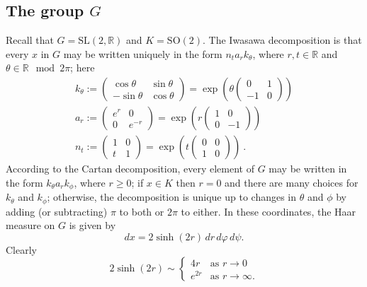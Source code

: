 \documentclass[12pt,a4paper]{amsart}
\theoremstyle{definition}
\theoremstyle{remark}
\numberwithin{equation}{section}
\newcommand{\lpar}{\left(}
\newcommand{\rpar}{\right)}
\newcommand{\R}{\mathbb{R}}
\begin{document}
\subsection*{The group $G$}
Recall that $G = \mathrm{SL}(2,\mathbb{R})$ and $K = \mathrm{SO}(2)$.
The Iwasawa decomposition is that every $x$ in $G$ may be written uniquely in the form $n_t a_r k_\theta$, where $r, t\in \R$ and $\theta \in \R \mod 2\pi$; here
\[
\begin{gathered}
k_\theta := \begin{pmatrix} \cos\theta & \sin\theta \\ -\sin\theta & \cos\theta \end{pmatrix} = \exp\lpar \theta \begin{pmatrix} 0 & 1 \\ -1 & 0 \end{pmatrix} \rpar
\\
a_r := \begin{pmatrix} e^r &0 \\ 0  & e^{-r} \end{pmatrix} 
= \exp\lpar r \begin{pmatrix} 1 & 0 \\ 0 & -1\end{pmatrix} \rpar
\\
n_t := \begin{pmatrix} 1 & 0 \\ t & 1 \end{pmatrix} = \exp\lpar t \begin{pmatrix} 0 & 0\\ 1 & 0 \end{pmatrix} \rpar \ .
\end{gathered}
\]
According to the Cartan decomposition, every element of $G$ may be written in the form $k_\theta a_r k_\phi$, where $r \geq 0$; if $x \in K$ then $r = 0$ and there are many choices for $k_\theta$ and $k_\phi$; otherwise, the decomposition is unique up to changes in $\theta$ and $\phi$ by adding (or subtracting) $\pi$ to both or $2\pi$ to either.
In these coordinates, the Haar measure on $G$ is given by
\begin{equation*}%
dx=2 \sinh(2r) \,dr \,d\varphi \,d\psi.
\end{equation*}
Clearly
\[
2 \sinh(2r)\sim
\begin{cases}4r & \text{as $r\to 0$}
\\[3pt]
e^{2r} & \text{as $r\to \infty$}.
\end{cases}
\]
\end{document}
